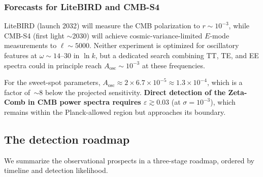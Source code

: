\documentclass[12pt,a4paper]{article}
\begin{document}
\subsubsection{Forecasts for LiteBIRD and CMB-S4}

LiteBIRD (launch 2032) will measure the CMB
polarization to $r\sim 10^{-3}$, while CMB-S4
(first light $\sim$2030) will achieve cosmic-variance-limited
$E$-mode measurements to $\ell\sim 5000$.
Neither experiment is optimized for oscillatory
features at $\omega\sim 14$--$30$ in $\ln k$, but
a dedicated search combining TT, TE, and EE
spectra could in principle reach
$A_{\mathrm{osc}}\sim 10^{-3}$ at these
frequencies.

For the sweet-spot parameters,
$A_{\mathrm{osc}}\approx 2\times 6.7\times 10^{-5}
\approx 1.3\times 10^{-4}$,
which is a factor of~$\sim\!8$ below the projected
sensitivity.
\textbf{Direct detection of the Zeta-Comb in CMB
power spectra requires $\varepsilon\gtrsim 0.03$}
(at $\sigma = 10^{-3}$), which remains within
the Planck-allowed region but approaches its boundary.


\subsection{The detection roadmap}
\label{sec:roadmap}

We summarize the observational prospects in a
three-stage roadmap, ordered by timeline and
detection likelihood.
\end{document}

